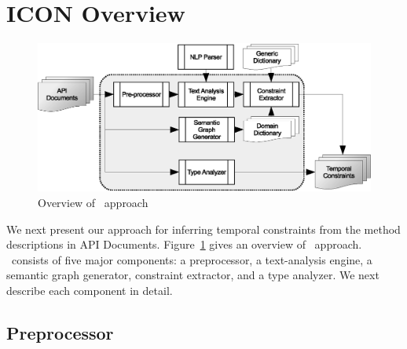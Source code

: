 \section{ICON Overview}
\label{sec:approach}

\begin{figure}
	\centering
		\includegraphics[scale=0.45]{approach.eps}
	\caption{Overview of \tool\ approach}
	\label{fig:approachOverview}
\end{figure}

We next present our approach for inferring temporal constraints
from the method descriptions in API Documents.
Figure~\ref{fig:approachOverview} gives an overview of \tool\ approach.
\tool\ consists of five major components: a preprocessor, a text-analysis engine, a semantic graph generator, constraint extractor, and a type analyzer.
We next describe each component in detail.



\subsection{Preprocessor}
\label{sub:prep}

